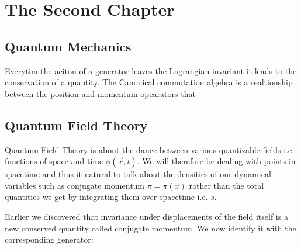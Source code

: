 \chapter{The Second Chapter}
\section{Quantum Mechanics}
Everytim the aciton of a generator leaves the Lagrangian invariant it leads to the conservation of a quantity. The Canonical commutation algebra is a realtionship between the position and momentum opearators that

\section{Quantum Field Theory}
Quantum Field Theory is about the dance between various quantizable fields i.e. functions of space and time $\phi (\vec{x},t)$. We will therefore be dealing with points in spacetime and thus it natural to talk about the densities of our dynamical variables such as conjugate momentum $\pi = \pi (x)$ rather than the total quantities we get by integrating them over spacetime i.e. $s$.

Earlier we discovered that invariance under displacements of the field itself is a new conserved quantity called conjugate momentum. We now identify it with the corresponding generator:

